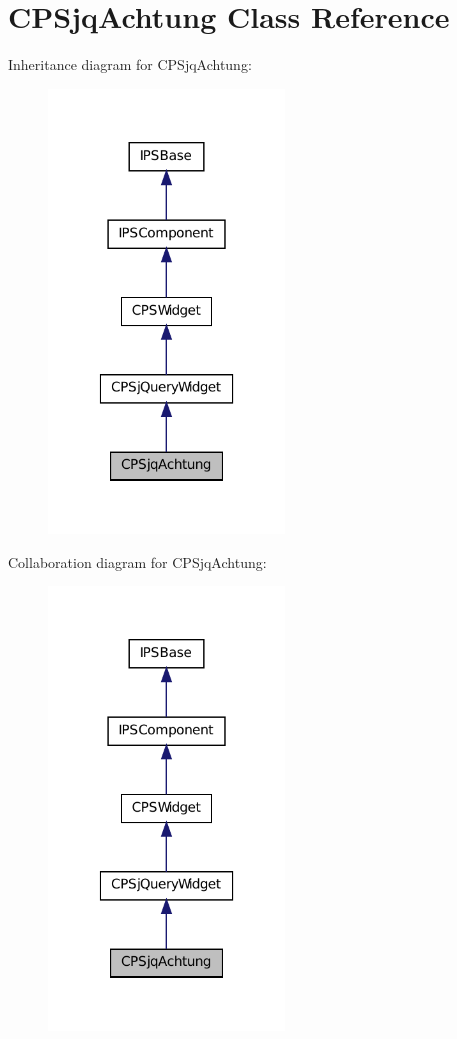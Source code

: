 \hypertarget{classCPSjqAchtung}{
\section{CPSjqAchtung Class Reference}
\label{classCPSjqAchtung}
}


Inheritance diagram for CPSjqAchtung:\nopagebreak
\begin{figure}[H]
\begin{center}
\leavevmode
\includegraphics[width=178pt]{classCPSjqAchtung__inherit__graph}
\end{center}
\end{figure}


Collaboration diagram for CPSjqAchtung:\nopagebreak
\begin{figure}[H]
\begin{center}
\leavevmode
\includegraphics[width=178pt]{classCPSjqAchtung__coll__graph}
\end{center}
\end{figure}
